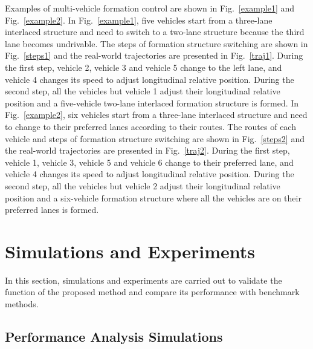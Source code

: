 \documentclass[journal]{IEEEtranTIE}
\begin{document}
Examples of multi-vehicle formation control are shown in Fig.~\ref{example1} and Fig.~\ref{example2}. In Fig.~\ref{example1}, five vehicles start from a three-lane interlaced structure and need to switch to a two-lane structure because the third lane becomes undrivable. The steps of formation structure switching are shown in Fig.~\ref{steps1} and the real-world trajectories are presented in Fig.~\ref{traj1}. During the first step, vehicle 2, vehicle 3 and vehicle 5 change to the left lane, and vehicle 4 changes its speed to adjust longitudinal relative position. During the second step, all the vehicles but vehicle 1 adjust their longitudinal relative position and a five-vehicle two-lane interlaced formation structure is formed. In Fig.~\ref{example2}, six vehicles start from a three-lane interlaced structure and need to change to their preferred lanes according to their routes. The routes of each vehicle and steps of formation structure switching are shown in Fig.~\ref{steps2} and the real-world trajectories are presented in Fig.~\ref{traj2}. During the first step, vehicle 1, vehicle 3, vehicle 5 and vehicle 6 change to their preferred lane, and vehicle 4 changes its speed to adjust longitudinal relative position. During the second step, all the vehicles but vehicle 2 adjust their longitudinal relative position and a six-vehicle formation structure where all the vehicles are on their preferred lanes is formed. 




%
\section{Simulations and Experiments}
\label{simexp}
%


In this section, simulations and experiments are carried out to validate the function of the proposed method and compare its performance with benchmark methods. 

%
\subsection{Performance Analysis Simulations}
\label{simu}
%
\end{document}

